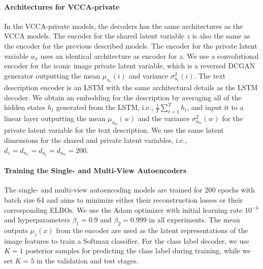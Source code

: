 \paragraph{Architectures for VCCA-private} In the VCCA-private models, the decoders has the same architectures as the VCCA models. The encoder for the shared latent variable $z$ is also the same as the encoder for the previous described models. The encoder for the private latent variable $u_{x}$ uses an identical architecture as encoder for $z$. We use a convolutional encoder for the iconic image private latent variable, which is a reversed DCGAN generator outputting the mean $\mu_{u_{i}}(i)$ and variance ${\sigma}_{u_{i}}^2(i)$. The text description encoder is an LSTM with the same architectural details as the LSTM decoder. We obtain an embedding for the description by averaging all of the hidden states $h_t$ generated from the LSTM, i.e., $\frac{1}{T} \sum_{t=1}^{T} h_t$, and input it to a linear layer outputting the mean $\mu_{u_{w}}(w)$ and the variance ${\sigma}_{u_{w}}^2(w)$ for the private latent variable for the text description. We use the same latent dimensions for the shared and private latent variables, i.e., $d_{z} = d_{u_{x}} = d_{u_{i}} = d_{u_{w}} = 200$. 

\vspace{-3mm}
\paragraph{Training the Single- and Multi-View Autoencoders} The single- and multi-view autoencoding models are trained for 200 epochs with batch size 64 and aims to minimize either their reconstruction losses or their corresponding ELBOs. We use the Adam optimizer with initial learning rate $10^{-4}$ and hyperparameters $\beta_1 = 0.9$ and $\beta_2 = 0.999$ in all experiments. The mean outputs $\mu_{z}(x)$ from the encoder are used as the latent representations of the image features to train a Softmax classifier. For the class label decoder, we use $K=1$ posterior samples for predicting the class label during training, while we set $K=5$ in the validation and test stages. 

\vspace{-3mm}
